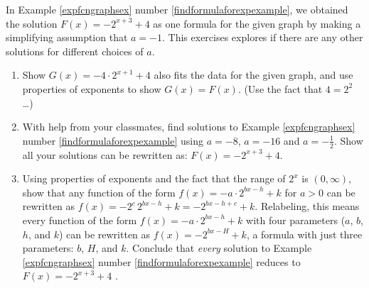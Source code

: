 \documentclass{ximera}
\begin{document}
\begin{problem}\label{morethanoneforexpexercise}
In Example \ref{expfcngraphsex} number \ref{findformulaforexpexample}, we obtained the solution  $F(x) = -2^{x+3} + 4$ as one formula for the given graph by making a simplifying assumption that $a = -1$.  This exercises explores if there are any other solutions for different choices of $a$.

\begin{enumerate}

\item  Show  $G(x) = -4 \cdot 2^{x+1} + 4$ also fits the data for the given graph, and use  properties of exponents to show $G(x) = F(x)$.  (Use the fact that $4 = 2^2$ \ldots)

\item With help from your classmates, find solutions to  Example \ref{expfcngraphsex} number \ref{findformulaforexpexample} using $a = -8$, $a = -16$ and  $a = -\frac{1}{2}$.  Show all your solutions can be rewritten as: $F(x) = -2^{x+3} + 4$.

\item  Using properties of exponents and the fact that the range of $2^{x}$ is $(0, \infty)$, show that any function of the form $f(x) = -a \cdot 2^{bx-h} + k$ for $a> 0$ can be rewritten as $f(x) = - 2^{c} \, 2^{bx-h} + k = -2^{bx-h+c} + k$.  Relabeling, this means every function of the form $f(x) = -a \cdot 2^{bx-h} + k$ with four parameters ($a$, $b$, $h$, and $k$) can be rewritten as $f(x) =  - 2^{bx - H} + k$, a formula with just three parameters:  $b$, $H$, and $k$.  Conclude that  \textit{every} solution to Example \ref{expfcngraphsex} number \ref{findformulaforexpexample} reduces to $F(x) = -2^{x+3} + 4$ .
\end{enumerate}

\end{problem}
\end{document}
